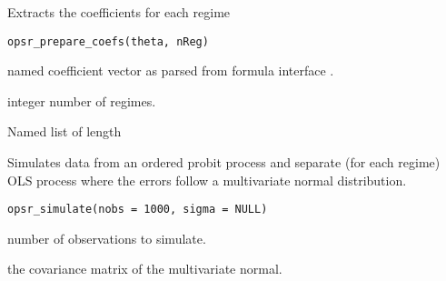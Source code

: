 \documentclass[letterpaper]{book}
\begin{document}
%
\begin{Description}
Extracts the coefficients for each regime
\end{Description}
%
\begin{Usage}
\begin{verbatim}
opsr_prepare_coefs(theta, nReg)
\end{verbatim}
\end{Usage}
%
\begin{Arguments}
\begin{ldescription}
\item[\code{theta}] named coefficient vector as parsed from formula interface .

\item[\code{nReg}] integer number of regimes.
\end{ldescription}
\end{Arguments}
%
\begin{Value}
Named list of length 
\end{Value}
%
\begin{Examples}
\end{Examples}
%
\begin{Description}
Simulates data from an ordered probit process and separate (for each regime)
OLS process where the errors follow a multivariate normal distribution.
\end{Description}
%
\begin{Usage}
\begin{verbatim}
opsr_simulate(nobs = 1000, sigma = NULL)
\end{verbatim}
\end{Usage}
%
\begin{Arguments}
\begin{ldescription}
\item[\code{nobs}] number of observations to simulate.

\item[\code{sigma}] the covariance matrix of the multivariate normal.
\end{ldescription}
\end{Arguments}
\end{document}
